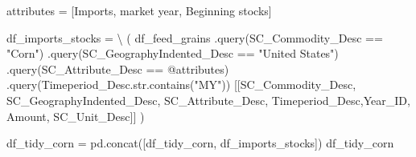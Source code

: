 \documentclass[
  letterpaper,
  DIV=11,
  numbers=noendperiod]{scrreprt}
\newenvironment{Shaded}{\begin{snugshade}}{\end{snugshade}}
\newcommand{\NormalTok}[1]{\textcolor[rgb]{0.00,0.23,0.31}{#1}}
\newcommand{\OperatorTok}[1]{\textcolor[rgb]{0.37,0.37,0.37}{#1}}
\newcommand{\StringTok}[1]{\textcolor[rgb]{0.13,0.47,0.30}{#1}}
\begin{document}
\begin{Shaded}
\begin{Highlighting}[]
\NormalTok{attributes }\OperatorTok{=}\NormalTok{ [}\StringTok{\textquotesingle{}Imports, market year\textquotesingle{}}\NormalTok{, }\StringTok{\textquotesingle{}Beginning stocks\textquotesingle{}}\NormalTok{]}

\NormalTok{df\_imports\_stocks }\OperatorTok{=} \OperatorTok{\textbackslash{}}
\NormalTok{    (}
\NormalTok{    df\_feed\_grains}
\NormalTok{        .query(}\StringTok{\textquotesingle{}SC\_Commodity\_Desc == "Corn"\textquotesingle{}}\NormalTok{)}
\NormalTok{        .query(}\StringTok{\textquotesingle{}SC\_GeographyIndented\_Desc == "United States"\textquotesingle{}}\NormalTok{)}
\NormalTok{        .query(}\StringTok{\textquotesingle{}SC\_Attribute\_Desc == @attributes\textquotesingle{}}\NormalTok{)}
\NormalTok{        .query(}\StringTok{\textquotesingle{}Timeperiod\_Desc.str.contains("MY")\textquotesingle{}}\NormalTok{)}
\NormalTok{        [[}\StringTok{\textquotesingle{}SC\_Commodity\_Desc\textquotesingle{}}\NormalTok{, }\StringTok{\textquotesingle{}SC\_GeographyIndented\_Desc\textquotesingle{}}\NormalTok{, }\StringTok{\textquotesingle{}SC\_Attribute\_Desc\textquotesingle{}}\NormalTok{, }\StringTok{\textquotesingle{}Timeperiod\_Desc\textquotesingle{}}\NormalTok{,}\StringTok{\textquotesingle{}Year\_ID\textquotesingle{}}\NormalTok{, }\StringTok{\textquotesingle{}Amount\textquotesingle{}}\NormalTok{, }\StringTok{\textquotesingle{}SC\_Unit\_Desc\textquotesingle{}}\NormalTok{]]}
\NormalTok{    )}

\NormalTok{df\_tidy\_corn }\OperatorTok{=}\NormalTok{ pd.concat([df\_tidy\_corn, df\_imports\_stocks])}
\NormalTok{df\_tidy\_corn}
\end{Highlighting}
\end{Shaded}
\end{document}
